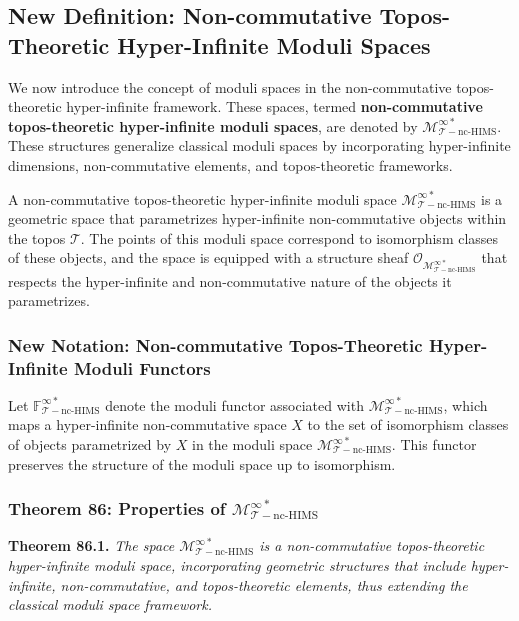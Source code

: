 \documentclass{article}
\begin{document}
\subsection{New Definition: Non-commutative Topos-Theoretic Hyper-Infinite Moduli Spaces}
We now introduce the concept of moduli spaces in the non-commutative topos-theoretic hyper-infinite framework. These spaces, termed \textbf{non-commutative topos-theoretic hyper-infinite moduli spaces}, are denoted by \(\mathcal{M}_{\mathcal{T}-\text{nc-HIMS}}^{\infty *}\). These structures generalize classical moduli spaces by incorporating hyper-infinite dimensions, non-commutative elements, and topos-theoretic frameworks.

A non-commutative topos-theoretic hyper-infinite moduli space \(\mathcal{M}_{\mathcal{T}-\text{nc-HIMS}}^{\infty *}\) is a geometric space that parametrizes hyper-infinite non-commutative objects within the topos \(\mathcal{T}\). The points of this moduli space correspond to isomorphism classes of these objects, and the space is equipped with a structure sheaf \(\mathcal{O}_{\mathcal{M}_{\mathcal{T}-\text{nc-HIMS}}^{\infty *}}\) that respects the hyper-infinite and non-commutative nature of the objects it parametrizes.

\subsubsection{New Notation: Non-commutative Topos-Theoretic Hyper-Infinite Moduli Functors}
Let \(\mathbb{F}_{\mathcal{T}-\text{nc-HIMS}}^{\infty *}\) denote the moduli functor associated with \(\mathcal{M}_{\mathcal{T}-\text{nc-HIMS}}^{\infty *}\), which maps a hyper-infinite non-commutative space \(X\) to the set of isomorphism classes of objects parametrized by \(X\) in the moduli space \(\mathcal{M}_{\mathcal{T}-\text{nc-HIMS}}^{\infty *}\). This functor preserves the structure of the moduli space up to isomorphism.

\subsubsection{Theorem 86: Properties of \(\mathcal{M}_{\mathcal{T}-\text{nc-HIMS}}^{\infty *}\)}
\textbf{Theorem 86.1.} \textit{The space \(\mathcal{M}_{\mathcal{T}-\text{nc-HIMS}}^{\infty *}\) is a non-commutative topos-theoretic hyper-infinite moduli space, incorporating geometric structures that include hyper-infinite, non-commutative, and topos-theoretic elements, thus extending the classical moduli space framework.}
\end{document}
